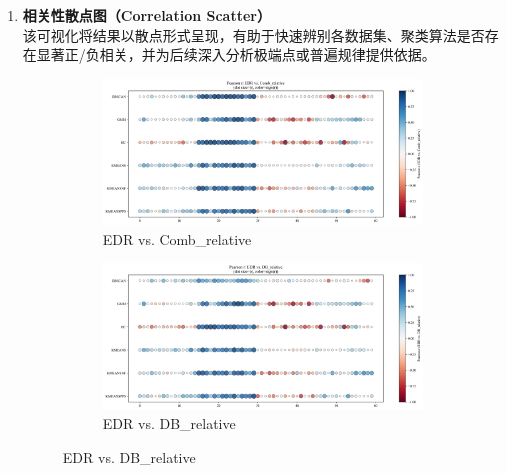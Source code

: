 \documentclass[10pt]{article} %
\numberwithin{equation}{section}
\begin{document}
\begin{enumerate}[label=(\alph*)]
    \item \textbf{相关性散点图（Correlation Scatter）} \\
    该可视化将结果以散点形式呈现，有助于快速辨别各数据集、聚类算法是否存在显著正/负相关，并为后续深入分析极端点或普遍规律提供依据。
\begin{figure}[htbp]
    \centering
    
    \begin{subfigure}[b]{0.45\linewidth}
        \centering
        \includegraphics[width=\linewidth]{figures/point graph/dot_EDR_vs_Comb_relative_sorted.png}
        \caption{EDR vs. Comb\_relative}
        \label{fig:dot_edr_comb}
    \end{subfigure}
    \hfill
    \begin{subfigure}[b]{0.45\linewidth}
        \centering
        \includegraphics[width=\linewidth]{figures/point graph/dot_EDR_vs_DB_relative_sorted.png}
        \caption{EDR vs. DB\_relative}
        \label{fig:dot_edr_db}
    \end{subfigure}

    \vspace{1em} %


\end{figure}
\end{enumerate}
\end{document}
